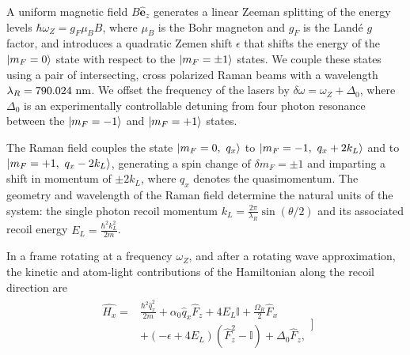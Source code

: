 A uniform magnetic field $B\mathbf{\hat{e}}_z$ generates a linear Zeeman splitting of the energy levels $\hbar\omega_Z=g_F\mu_BB$, where $\mu_B$ is the Bohr magneton and $g_F$ is the Land\'e $g$ factor, and introduces a quadratic Zemen shift $\epsilon$ that shifts the energy of the $|m_F=0\rangle$ state with respect to the $|m_F=\pm1\rangle$ states. We couple these states using a pair of intersecting, cross polarized Raman beams with a wavelength $\lambda_R=790.024{\ {\rm nm}}$. We offset the frequency of the lasers by $\delta\omega=\omega_Z+\Delta_0$, where $\Delta_0$ is an experimentally controllable detuning from four photon resonance between the $|m_F=-1\rangle$ and $|m_F=+1\rangle$ states. 

The Raman field couples the state $|m_F=0,\ q_x\rangle$ to $|m_F=-1,\ q_x+2k_L\rangle$ and to $|m_F=+1,\ q_x-2k_L\rangle$, generating a spin change of $\delta m_F=\pm1$ and imparting a shift in momentum of $\pm 2k_L$, where $q_x$ denotes the quasimomentum. The geometry and wavelength of the Raman field determine the natural units of the system: the single photon recoil momentum $k_L=\frac{2\pi}{\lambda_R}\sin(\theta/2)$ and its associated recoil energy $E_L=\frac{\hbar^2k_L^2}{2m}$.


In a frame rotating at a frequency $\omega_Z$, and after a rotating wave approximation, the kinetic and atom-light contributions of the Hamiltonian along the recoil direction are
\begin{align}
\begin{split}
\hat{H_x} = &\frac{\hbar^2\hat{q}_x^2}{2m} + \alpha_0\hat{q}_x\hat{F}_z +4E_L\mathbb{I} + \frac{\Omega_R}{2}\hat{F}_x\\
& +(-\epsilon+4E_L)(\hat{F}_z^2-\mathbb{I}) +\Delta_0\hat{F}_z, 
\label{Eq:SOCone}
\end{split}]
\end{align}	

